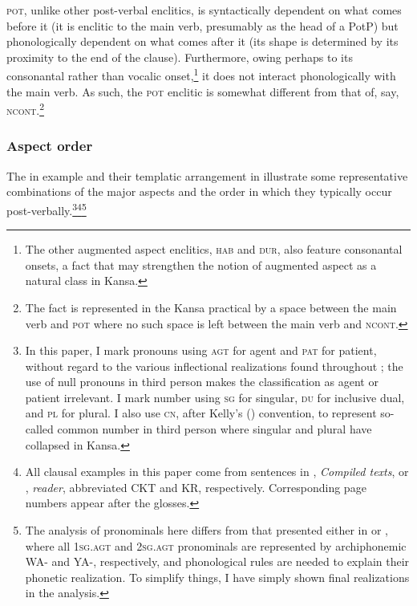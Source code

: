 \documentclass[output=paper]{LSP/langsci}
\begin{document}
\textsc{pot}, unlike other post-verbal enclitics, is syntactically dependent on what comes before it (it is enclitic to the main verb, presumably as the head of a PotP) but phonologically dependent on what comes after it (its shape is determined by its proximity to the end of the clause). Furthermore, owing perhaps to its consonantal rather than vocalic onset,\footnote{The other augmented aspect enclitics, \textsc{hab} and \textsc{dur}, also feature consonantal onsets, a fact that may strengthen the notion of augmented aspect as a natural class in Kansa.} it does not interact phonologically with the main verb. As such, the \textsc{pot} enclitic is somewhat different from that of, say, \textsc{ncont}.\footnote{The fact is represented in the Kansa practical  by a space between the main verb and \textsc{pot} where no such space is left between the main verb and \textsc{ncont}.}

\subsubsection{Aspect order} 
 
The  in example  and their templatic arrangement in  illustrate some representative combinations of the major aspects and the order in which they typically occur post-verbally.\footnote{In this paper, I mark pronouns using \textsc{agt} for agent and \textsc{pat} for patient, without regard to the various inflectional realizations found throughout ; the use of null pronouns in third person makes the classification as agent or patient irrelevant. I mark number using \textsc{sg} for singular, \textsc{du} for inclusive dual, and \textsc{pl} for plural. I also use \textsc{cn}, after Kelly's (\citeyear{Kelly1992})   convention, to represent so-called common number in third person where singular and plural have collapsed in Kansa.}\footnote{All clausal examples in this paper come from sentences in  \citet{McBrideCumberland2009}, \textit{Compiled  texts}, or \citet{McBrideCumberland2010}, \textit{ reader}, abbreviated CKT and KR, respectively. Corresponding page numbers appear after the  glosses.}\footnote{The analysis of pronominals here differs from that presented either in \citet{Quintero2004} or \citet{Rankin2005b}, where all \textsc{1sg.agt} and \textsc{2sg.agt} pronominals are represented by archiphonemic WA- and YA-, respectively, and phonological rules are needed to explain their phonetic realization. To simplify things, I have simply shown final realizations in the analysis.}
 
\end{document}
